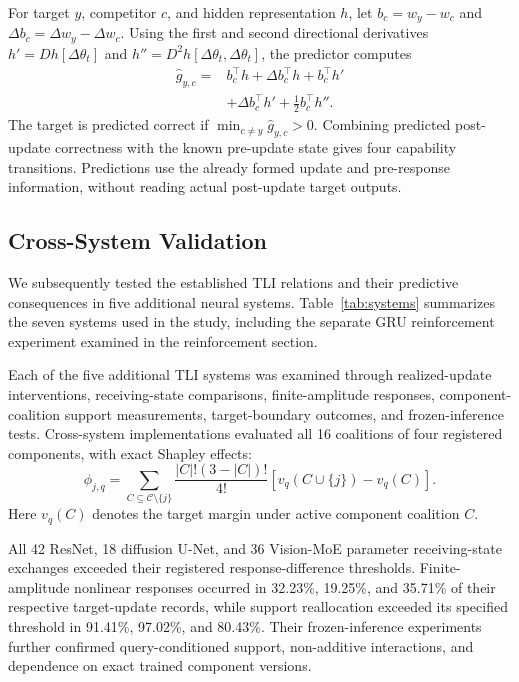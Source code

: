 \documentclass[12pt,letterpaper]{article}
\begin{document}
For target $y$, competitor $c$, and hidden representation $h$, let $b_c=w_y-w_c$ and $\Delta b_c=\Delta w_y-\Delta w_c$. Using the first and second directional derivatives $h'=Dh[\Delta\theta_t]$ and $h''=D^2h[\Delta\theta_t,\Delta\theta_t]$, the predictor computes
\begin{equation}
 \begin{aligned}
 \widehat g_{y,c}={}&b_c^\top h+\Delta b_c^\top h+b_c^\top h'\\
 &+\Delta b_c^\top h'+\tfrac12 b_c^\top h''.
 \end{aligned}
 \label{eq:predict}
\end{equation}
The target is predicted correct if $\min_{c\ne y}\widehat g_{y,c}>0$. Combining predicted post-update correctness with the known pre-update state gives four capability transitions. Predictions use the already formed update and pre-response information, without reading actual post-update target outputs.

\subsection{Cross-System Validation}
We subsequently tested the established TLI relations and their predictive consequences in five additional neural systems. Table~\ref{tab:systems} summarizes the seven systems used in the study, including the separate GRU reinforcement experiment examined in the reinforcement section.



Each of the five additional TLI systems was examined through realized-update interventions, receiving-state comparisons, finite-amplitude responses, component-coalition support measurements, target-boundary outcomes, and frozen-inference tests. Cross-system implementations evaluated all 16 coalitions of four registered components, with exact Shapley effects:
\begin{equation}
 \phi_{j,q}=\!\!\sum_{C\subseteq\mathcal C\setminus\{j\}}
 \frac{|C|!(3-|C|)!}{4!}\left[v_q(C\cup\{j\})-v_q(C)\right].
 \label{eq:shapley}
\end{equation}
Here $v_q(C)$ denotes the target margin under active component coalition $C$.

All 42 ResNet, 18 diffusion U-Net, and 36 Vision-MoE parameter receiving-state exchanges exceeded their registered response-difference thresholds. Finite-amplitude nonlinear responses occurred in 32.23\%, 19.25\%, and 35.71\% of their respective target-update records, while support reallocation exceeded its specified threshold in 91.41\%, 97.02\%, and 80.43\%. Their frozen-inference experiments further confirmed query-conditioned support, non-additive interactions, and dependence on exact trained component versions.
\end{document}
